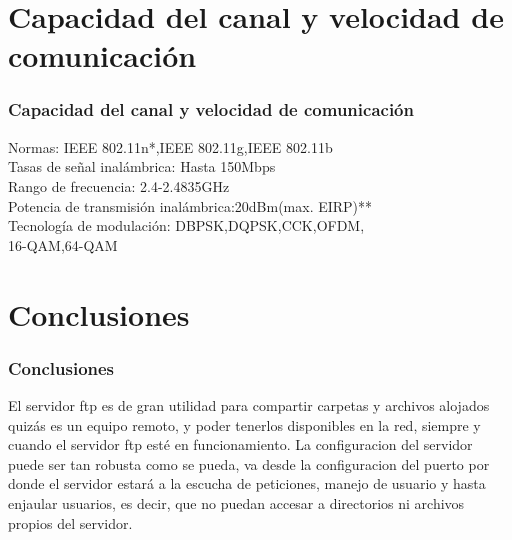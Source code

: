 \section{Capacidad del canal y velocidad de comunicaci\'on}
  \begin{frame}
    \frametitle{Capacidad del canal y velocidad de comunicaci\'on}       
      Normas: IEEE 802.11n*,IEEE 802.11g,IEEE 802.11b\\
      Tasas de señal inalámbrica: Hasta 150Mbps\\
      Rango de frecuencia: 2.4-2.4835GHz\\
      Potencia de transmisión inalámbrica:20dBm(max. EIRP)**\\
      Tecnología de modulación: DBPSK,DQPSK,CCK,OFDM,\\
      16-QAM,64-QAM\\
  \end{frame}
\section{Conclusiones}
  \begin{frame}
    \frametitle{Conclusiones}
    El servidor ftp es de gran utilidad para compartir carpetas y archivos alojados quizás es un equipo remoto, y poder
    tenerlos disponibles en la red, siempre y cuando el servidor ftp esté en funcionamiento.
    La configuracion del servidor puede ser tan robusta como se pueda, va desde la configuracion del puerto por donde 
    el servidor estará a la escucha de peticiones, manejo de usuario y hasta enjaular usuarios, es decir, que no puedan 
    accesar a directorios ni archivos propios del servidor.

  \end{frame}
